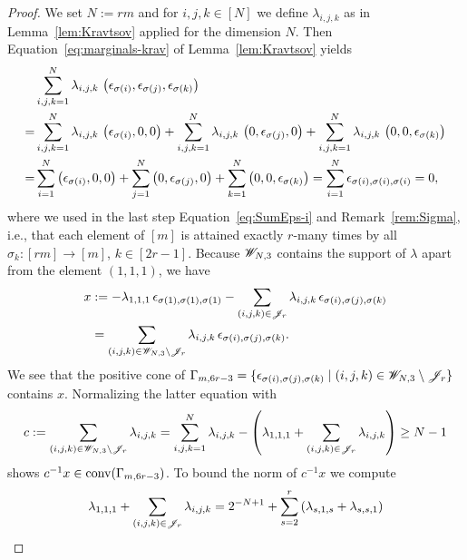 \begin{proof}
	We set $N := r m$ and for $i,j,k \in [N]$ we define $\lambda_{i,j,k}$ as in Lemma~\ref{lem:Kravtsov} applied for the dimension $N$. Then Equation~\eqref{eq:marginals-krav} of Lemma~\ref{lem:Kravtsov} yields
	\begin{align*}
		&\sum_{i,j,k=1}^N \lambda_{i,j,k} \, \left( \epsilon_{\sigma(i)}, \epsilon_{\sigma(j)}, \epsilon_{\sigma(k)} \right)\\
		= &\sum_{i,j,k=1}^N \lambda_{i,j,k} \, \left( \epsilon_{\sigma(i)}, 0, 0 \right)+ \sum_{i,j,k=1}^N \lambda_{i,j,k} \, \left( 0, \epsilon_{ \sigma(j)}, 0 \right) + \sum_{i,j,k=1}^N \lambda_{i,j,k} \, \left( 0, 0, \epsilon_{\sigma(k)} \right) \\
		= &\sum_{i=1}^N \left( \epsilon_{\sigma(i)}, 0, 0 \right)+ \sum_{j=1}^N  \left( 0, \epsilon_{ \sigma(j)}, 0 \right) + \sum_{k=1}^N \left( 0, 0, \epsilon_{\sigma(k)} \right) 
		= \sum_{i=1}^N \epsilon_{\sigma(i),\sigma(i),\sigma(i)} = 0 ,
	\end{align*}
	where we used in the last step Equation~\eqref{eq:SumEps-i} and Remark~\ref{rem:Sigma}, i.e., that each element of $[m]$ is attained exactly $r$-many times by all $\sigma_k \colon [r m] \to [m]$, $k \in [2 r - 1]$. Because $\mathscr{W}_{N,3}$ contains the support of $\lambda$ apart from the element $(1,1,1)$, we have
	\begin{equation}\label{eq:x-stacked}
		\begin{split}
			x &:= - \lambda_{1,1,1} \, \epsilon_{\sigma(1), \sigma(1), \sigma(1)} -  \sum_{(i,j,k) \in \mathscr{J}_{r}} \lambda_{i,j,k} \, \epsilon_{\sigma(i), \sigma(j), \sigma(k)} \\
			&=\sum_{(i,j,k) \in \mathscr{W}_{N,3} \setminus \mathscr{J}_{r}} \lambda_{i,j,k} \, \epsilon_{\sigma(i), \sigma(j), \sigma(k)} . 
		\end{split}
	\end{equation}
	We see that the positive cone of $\Gamma_{m,6 r - 3} = \lbrace \epsilon_{\sigma(i), \sigma(j), \sigma(k)} \mid (i,j,k) \in \mathscr{W}_{N,3} \setminus \mathscr{J}_{r} \rbrace$ contains $x$.
	Normalizing the latter equation with
	\begin{align*}
		c := \sum_{(i,j,k) \in \mathscr{W}_{N,3} \setminus \mathscr{J}_{r}} \lambda_{i,j,k} 
		= \sum_{i,j,k=1}^N \lambda_{i,j,k} - \left( \lambda_{1,1,1} + \sum_{(i,j,k)\in \mathscr{J}_{r}} \lambda_{i,j,k} \right) \geq N-1
	\end{align*}
	shows $c^{-1} x \in \operatorname{conv}(\Gamma_{m,6 r - 3})$. To bound the norm of $c^{-1} x$ we compute
	\begin{align*}
		\lambda_{1,1,1} + \sum_{(i,j,k) \in \Jscr_{r}} \lambda_{i,j,k} &= 2^{-N+1} + \sum_{s=2}^r \left( \lambda_{s,1,s} + \lambda_{s,s,1} \right) \\

\end{align*}
\end{proof}
